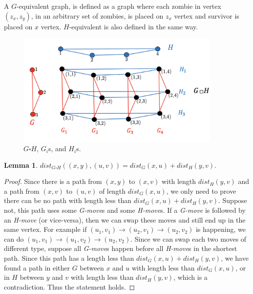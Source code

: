 \documentclass[1p]{elsarticle}
\newtheorem{lemma}[theorem]{Lemma}
\begin{document}
A $G$-equivalent graph, is defined as a graph where each zombie in vertex $(z_x,z_y)$, in an arbitrary set of zombies,
is placed on $z_x$ vertex and survivor is placed on $x$ vertex. $H$-equivalent is also defined in the same way. 


\begin{figure}[h!]
	
	\centering
	\includegraphics[width=0.9\textwidth]{fig/cp3.png}
	\caption{$G \square H$, $G_i$s, and $H_i$s.}
	\label{fig:p1}
\end{figure}



\begin{lemma} \label{shortestpathlemma}
	$dist_{G \square H}((x,y),(u,v)) = dist_G(x,u) + dist_H(y,v)$.
\end{lemma}
\begin{proof}
	Since there is a path from $(x,y)$ to $(x,v)$ with length $dist_H(y,v)$ and a path from $(x,v)$ to $(u,v)$ of length
	$dist_G(x,u)$, we only need to prove there can be no path with length less than $dist_G(x,u) + dist_H(y,v)$.
	Suppose not, this path uses some {\it G-move}s and some {\it H-move}s. If a {\it G-move} is followed by an {\it
	H-move} (or vice-versa), then we can swap these moves and still end up in the same vertex. For example if $(u_1,v_1)
	\rightarrow (u_2,v_1) \rightarrow (u_2,v_2)$ is happening, we can do $(u_1,v_1) \rightarrow (u_1,v_2) \rightarrow
	(u_2,v_2)$. Since we can swap each two moves of different type, suppose all {\it G-move}s happen before all {\it
	H-move}s in the shortest path. Since this path has a length less than $dist_G(x,u) + dist_H(y,v)$, we have found a
	path in either $G$ between $x$ and $u$ with length less than $dist_G(x,u)$, or in $H$ between $y$ and $v$ with
	length less than $dist_H(y,v)$, which is a contradiction. Thus the statement holds.
\end{proof}
\end{document}

